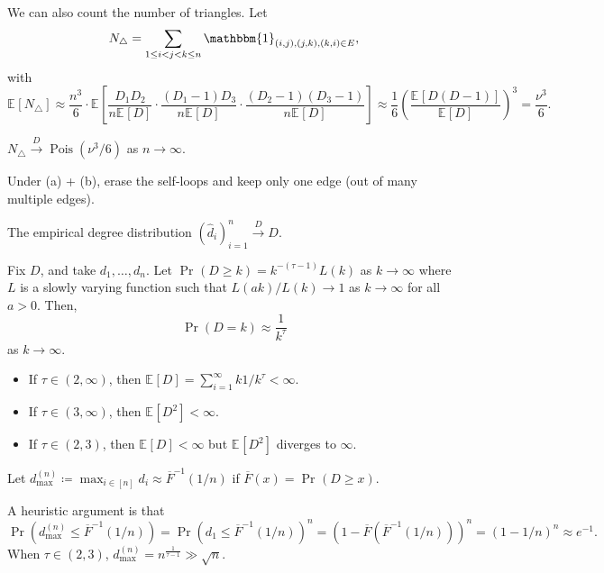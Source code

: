 \begin{eg}
	We can also count the number of triangles. Let
	\[
		N_{\triangle }
		= \sum_{1 \leq i < j < k \leq n} \mathbbm{1}_{(i, j) , (j, k), (k, i) \in E},
	\]
	with
	\[
		\mathbb{E}_{}[N_{\triangle }]
		\approx \frac{n^3}{6} \cdot \mathbb{E}_{}\left[\frac{D_1 D_2}{n \mathbb{E}_{}[D] } \cdot \frac{(D_1 - 1) D_3}{n \mathbb{E}_{}[D] } \cdot \frac{(D_2 - 1) (D_3 - 1)}{n \mathbb{E}_{}[D] }\right]
		\approx \frac{1}{6} \left( \frac{\mathbb{E}_{}[D (D-1)] }{\mathbb{E}_{}[D] } \right) ^3
		= \frac{\nu ^3}{6}.
	\]
\end{eg}

\begin{exercise}
	\(N_{\triangle } \overset{D}{\to} \operatorname{Pois}(\nu ^3 / 6) \) as \(n \to \infty \).
\end{exercise}

Under (a) + (b), erase the self-loops and keep only one edge (out of many multiple edges).

\begin{lemma}
	The empirical degree distribution \((\hat{d} _i)_{i=1}^n \overset{D}{\to} D\).
\end{lemma}

Fix \(D\), and take \(d_1, \dots , d_n\). Let \(\Pr_{}\left(D \geq k\right) = k^{-(\tau - 1)} L(k)\) as \(k \to \infty \) where \(L\) is a slowly varying function such that \(L(a k) / L(k) \to 1\) as \(k \to \infty \) for all \(a > 0\). Then,
\[
	\Pr_{}\left(D=k\right)
	\approx \frac{1}{k^{\tau }}
\]
as \(k \to \infty \).

\begin{itemize}
	\item If \(\tau \in (2, \infty )\), then \(\mathbb{E}_{}[D] = \sum_{i=1}^{\infty} k 1 / k^{\tau } < \infty \).
	\item If \(\tau \in (3, \infty )\), then \(\mathbb{E}_{}[D^2] < \infty \).
	\item If \(\tau \in (2, 3)\), then \(\mathbb{E}_{}[D] < \infty \) but \(\mathbb{E}_{}[D^2] \) diverges to \(\infty \).
\end{itemize}

Let \(d_{\max }^{(n)} \coloneqq \max _{i \in [n]} d_i \approx \overline{F} ^{-1} (1 / n)\) if \(\overline{F} (x) = \Pr_{}\left(D \geq x\right) \).

A heuristic argument is that
\[
	\Pr_{}\left(d_{\max }^{(n)} \leq \overline{F} ^{-1} (1 / n)\right)
	= \Pr_{}\left(d_1 \leq \overline{F} ^{-1} (1 / n)\right) ^n
	= \left( 1 - \overline{F} (\overline{F} ^{-1} (1 / n)) \right) ^n
	= \left( 1 - 1 / n \right) ^n
	\approx e^{-1}.
\]
When \(\tau \in (2, 3)\), \(d_{\max }^{(n)} = n^{\frac{1}{\tau - 1}} \gg \sqrt{n} \).

